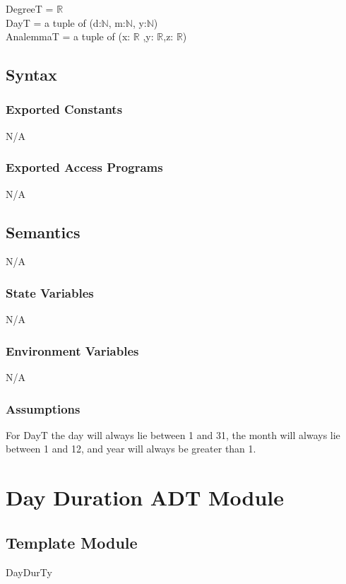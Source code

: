 \documentclass[12pt, titlepage]{article}
\begin{document}
DegreeT = $\mathbb{R}$\\
DayT = a tuple of (d:$\mathbb{N}$, m:$\mathbb{N}$, y:$\mathbb{N}$)\\
AnalemmaT = a tuple of (x: $\mathbb{R}$ ,y: $\mathbb{R}$,z: $\mathbb{R}$)\\

\subsection{Syntax}

\subsubsection{Exported Constants}
N/A\\

\subsubsection{Exported Access Programs}
N/A\\

\subsection{Semantics}
N/A\\
\subsubsection{State Variables}
N/A\\

\subsubsection{Environment Variables}

N/A\\

\subsubsection{Assumptions}
For DayT the day will always lie between 1 and 31, the month will always lie between 1 and 12, and year will always be greater than 1.

\section{Day Duration ADT Module} \label{ModuleADTD} 

\subsection{Template Module}
DayDurTy
\end{document}
